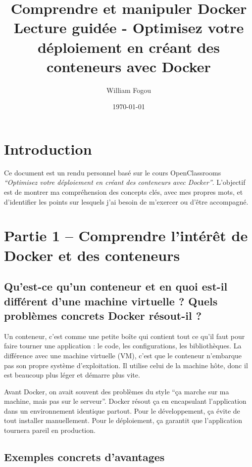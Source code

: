\documentclass[12pt,a4paper]{article}
\title{\textbf{Comprendre et manipuler Docker} \\
\large Lecture guidée - Optimisez votre déploiement en créant des conteneurs avec Docker}
\author{William Fogou}
\date{\today}
\begin{document}
\maketitle
\tableofcontents
\newpage

\section*{Introduction}
Ce document est un rendu personnel basé sur le cours OpenClassrooms \textit{“Optimisez votre déploiement en créant des conteneurs avec Docker”}. L’objectif est de montrer ma compréhension des concepts clés, avec mes propres mots, et d’identifier les points sur lesquels j’ai besoin de m’exercer ou d’être accompagné.

\newpage

\section{Partie 1 – Comprendre l'intérêt de Docker et des conteneurs}

\subsection{Qu'est-ce qu'un conteneur et en quoi est-il différent d'une machine virtuelle ? Quels problèmes concrets Docker résout-il ?}

Un conteneur, c’est comme une petite boîte qui contient tout ce qu’il faut pour faire tourner une application : le code, les configurations, les bibliothèques. La différence avec une machine virtuelle (VM), c’est que le conteneur n’embarque pas son propre système d’exploitation. Il utilise celui de la machine hôte, donc il est beaucoup plus léger et démarre plus vite.

Avant Docker, on avait souvent des problèmes du style “ça marche sur ma machine, mais pas sur le serveur”. Docker résout ça en encapsulant l’application dans un environnement identique partout. Pour le développement, ça évite de tout installer manuellement. Pour le déploiement, ça garantit que l’application tournera pareil en production.

\subsection{Exemples concrets d'avantages}
\end{document}
